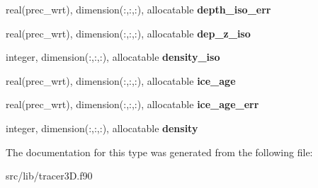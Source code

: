 \begin{DoxyCompactItemize}
real(prec\+\_\+wrt), dimension(\+:,\+:,\+:), allocatable {\bfseries depth\+\_\+iso\+\_\+err}
\item 
\mbox{\label{structtracer3d_1_1tracer__stats__class_af5c5194f11c1a13f0a5e2b4becd11cb1}} 
real(prec\+\_\+wrt), dimension(\+:,\+:,\+:), allocatable {\bfseries dep\+\_\+z\+\_\+iso}
\item 
\mbox{\label{structtracer3d_1_1tracer__stats__class_a9f30d08dd57b8d11a6609aace825d2ab}} 
integer, dimension(\+:,\+:,\+:), allocatable {\bfseries density\+\_\+iso}
\item 
\mbox{\label{structtracer3d_1_1tracer__stats__class_aaf14826847e5b8ed1adbbc1778545125}} 
real(prec\+\_\+wrt), dimension(\+:,\+:,\+:), allocatable {\bfseries ice\+\_\+age}
\item 
\mbox{\label{structtracer3d_1_1tracer__stats__class_ad56a9df4a9b46a785ac42dfa07fbc605}} 
real(prec\+\_\+wrt), dimension(\+:,\+:,\+:), allocatable {\bfseries ice\+\_\+age\+\_\+err}
\item 
\mbox{\label{structtracer3d_1_1tracer__stats__class_a40c3393808bd198f7b7fa97bd0417701}} 
integer, dimension(\+:,\+:,\+:), allocatable {\bfseries density}
\end{DoxyCompactItemize}


The documentation for this type was generated from the following file\+:\begin{DoxyCompactItemize}
\item 
src/lib/tracer3\+D.\+f90\end{DoxyCompactItemize}
